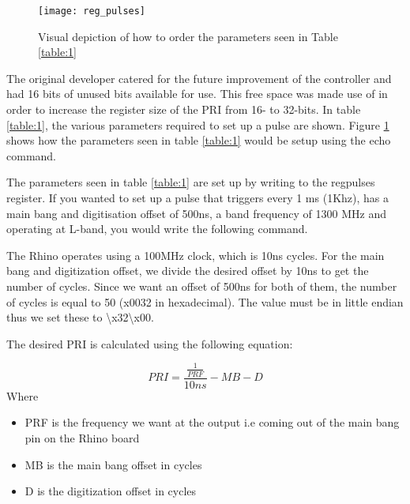 \documentclass[12pt, a4paper]{article}
\begin{document}
	\begin{figure}
		\centering
		\texttt{[image: reg\_pulses]}
		\caption{Visual depiction of how to order the parameters seen in Table \ref{table:1}}
		\label{fig:reg_pulses}
	\end{figure}



The original developer catered for the future improvement of the controller and had 16 bits of unused bits available for use. This free space was made use of in order to increase the register size of the PRI from 16- to 32-bits. In table \ref{table:1}, the various parameters required to set up a pulse are shown. Figure \ref{fig:reg_pulses} shows how the parameters seen in table \ref{table:1} would be setup using the echo command.


The parameters seen in table \ref{table:1} are set up by writing to the reg\textunderscore pulses register. If you wanted to set up a pulse that triggers every 1 ms (1Khz), has a main bang and digitisation offset of 500ns, a band frequency of 1300 MHz and operating at L-band, you would write the following command. 




The Rhino operates using a 100MHz clock, which is 10ns cycles. For the main bang and digitization offset, we divide the desired offset by 10ns to get the number of cycles. Since we want an offset of 500ns for both of them, the number of cycles is equal to 50 (x0032 in hexadecimal). The value must be in little endian thus we set these to \textbackslash x32\textbackslash x00. 


The desired PRI is calculated using the following equation:

	\[ 
		PRI = \frac{\frac{1}{PRF}}{10ns} - MB - D
	\]
Where
 
	\begin{itemize}
  		\item PRF is the frequency we want at the output i.e coming out of the main bang pin on the Rhino board
  		\item MB is the main bang offset in cycles
  		\item D is the digitization offset in cycles
	\end{itemize}
\end{document}
